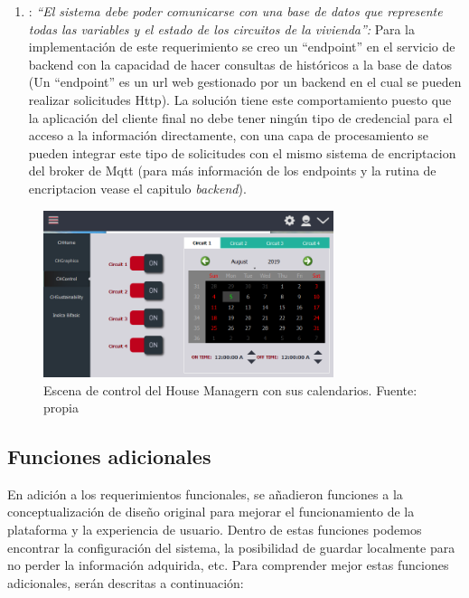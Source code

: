 \begin{enumerate}
	\item: \textsl{``El sistema debe poder comunicarse con una base de datos que represente todas las variables y el estado de los circuitos de la vivienda'':} Para la implementación de este requerimiento se creo un ``endpoint'' en el servicio de backend con la capacidad de hacer consultas de históricos a la base de datos (Un ``endpoint'' es un url web gestionado por un backend en el cual se pueden realizar solicitudes Http). La solución tiene este comportamiento puesto que la aplicación del cliente final no debe tener ningún tipo de credencial para el acceso a la información directamente, con una capa de procesamiento se pueden integrar este tipo de solicitudes con el mismo sistema de encriptacion del broker de Mqtt (para más información de los endpoints y la rutina de encriptacion vease el capitulo \textit{backend}).
\end{enumerate}


\begin{figure}[htbp]
	\centerline{\includegraphics[width=8.5cm]{figuras/housemanager_control.png}}
	\caption{Escena de control del House Managern con sus calendarios. Fuente: propia}
	\label{fig_8}
\end{figure}

\subsection{Funciones adicionales}

En adición a los requerimientos funcionales, se añadieron funciones a la conceptualización de diseño original para mejorar el funcionamiento de la plataforma y la experiencia de usuario. Dentro de estas funciones podemos encontrar la configuración del sistema, la posibilidad de guardar localmente para no perder la información adquirida, etc. Para comprender mejor estas funciones adicionales, serán descritas a continuación:


